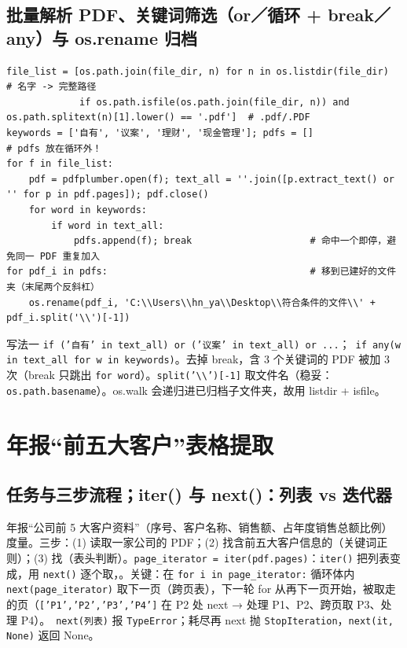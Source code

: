 \subsection{批量解析 PDF、关键词筛选（or／循环 + break／any）与 os.rename 归档}
\begin{lstlisting}[style=pyD07]
file_list = [os.path.join(file_dir, n) for n in os.listdir(file_dir)            # 名字 -> 完整路径
             if os.path.isfile(os.path.join(file_dir, n)) and os.path.splitext(n)[1].lower() == '.pdf']  # .pdf/.PDF
keywords = ['自有', '议案', '理财', '现金管理']; pdfs = []                     # pdfs 放在循环外！
for f in file_list:
    pdf = pdfplumber.open(f); text_all = ''.join([p.extract_text() or '' for p in pdf.pages]); pdf.close()
    for word in keywords:
        if word in text_all:
            pdfs.append(f); break                     # 命中一个即停，避免同一 PDF 重复加入
for pdf_i in pdfs:                                    # 移到已建好的文件夹（末尾两个反斜杠）
    os.rename(pdf_i, 'C:\\Users\\hn_ya\\Desktop\\符合条件的文件\\' + pdf_i.split('\\')[-1])
\end{lstlisting}
写法一 \texttt{if ('自有' in text\_all) or ('议案' in text\_all) or ...}；\tagext\ \texttt{if any(w in text\_all for w in keywords)}。去掉 break，含 3 个关键词的 PDF 被加 3 次（break 只跳出 \texttt{for word}）。\texttt{split('\textbackslash\textbackslash')[-1]} 取文件名（稳妥：\texttt{os.path.basename}）。os.walk 会递归进已归档子文件夹，故用 listdir + isfile。

\section{年报“前五大客户”表格提取}

\subsection{任务与三步流程；iter() 与 next()：列表 vs 迭代器}
年报“公司前 5 大客户资料”（序号、客户名称、销售额、占年度销售总额比例）度量。三步：(1) 读取一家公司的 PDF；(2) 找含前五大客户信息的（关键词正则）；(3) 找（表头判断）。\texttt{page\_iterator = iter(pdf.pages)}：\texttt{iter()} 把列表变成，用 \texttt{next()} 逐个取，。关键：在 \texttt{for i in page\_iterator:} 循环体内 \texttt{next(page\_iterator)} 取下一页（跨页表），下一轮 for 从再下一页开始，被取走的页（\texttt{['P1','P2','P3','P4']} 在 P2 处 next → 处理 P1、P2、跨页取 P3、处理 P4）。\tagext\ \texttt{next(列表)} 报 \texttt{TypeError}；耗尽再 next 抛 \texttt{StopIteration}，\texttt{next(it, None)} 返回 None。


